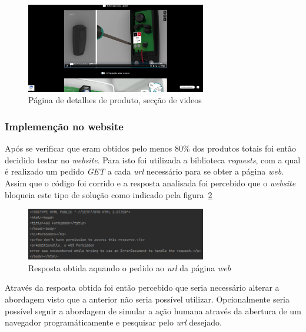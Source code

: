\begin{figure}[htb]
    \centering
    
    \includegraphics[width=0.7\textwidth]{images/implementacao/scraper/pagina_detalhes_videos.png}
    \caption{Página de detalhes de produto, secção de videos}
    \label{fig:55}
\end{figure}

\newpage

\subsubsection{Implemenção no website}

Após se verificar que eram obtidos pelo menos 80\% dos produtos totais foi então decidido testar no \textit{website}. Para isto foi utilizada a biblioteca \textit{requests}, com a qual é realizado um pedido \textit{GET} a cada \textit{url} necessário para se obter a página \textit{web}. Assim que o código foi corrido e a resposta analisada
foi percebido que o \textit{website} bloqueia este tipo de solução como indicado pela figura~\ref{fig:56}

\begin{figure}[htb]
    \centering
    \includegraphics[width=0.7\textwidth]{images/implementacao/scraper/forbiden_response.png}
    \caption{Resposta obtida aquando o pedido ao \textit{url} da página \textit{web}}
    \label{fig:56}
\end{figure}

Através da resposta obtida foi então percebido que seria necessário alterar a abordagem visto que a anterior não seria possível utilizar. Opcionalmente seria possível seguir a abordagem de simular a ação humana através da abertura de um navegador programáticamente e pesquisar pelo \textit{url} desejado. 

